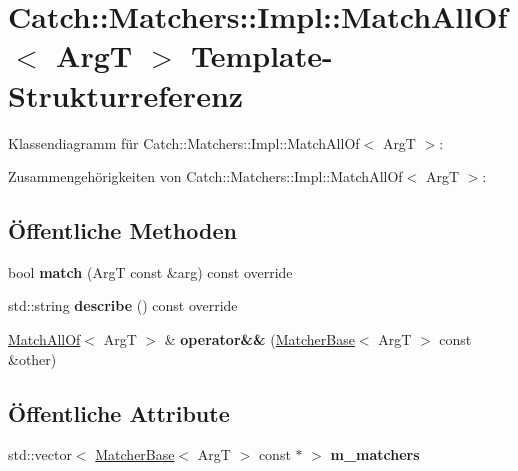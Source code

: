 \hypertarget{structCatch_1_1Matchers_1_1Impl_1_1MatchAllOf}{}\section{Catch\+:\+:Matchers\+:\+:Impl\+:\+:Match\+All\+Of$<$ ArgT $>$ Template-\/\+Strukturreferenz}
\label{structCatch_1_1Matchers_1_1Impl_1_1MatchAllOf}


Klassendiagramm für Catch\+:\+:Matchers\+:\+:Impl\+:\+:Match\+All\+Of$<$ ArgT $>$\+:


Zusammengehörigkeiten von Catch\+:\+:Matchers\+:\+:Impl\+:\+:Match\+All\+Of$<$ ArgT $>$\+:
\subsection*{Öffentliche Methoden}
\begin{DoxyCompactItemize}
\item 
\mbox{\label{structCatch_1_1Matchers_1_1Impl_1_1MatchAllOf_acfb377bda2c58ae62e6df9c3a8a89f8f}} 
bool {\bfseries match} (ArgT const \&arg) const override
\item 
\mbox{\label{structCatch_1_1Matchers_1_1Impl_1_1MatchAllOf_acbb9a083e93b546fd33c9235b644c40f}} 
std\+::string {\bfseries describe} () const override
\item 
\mbox{\label{structCatch_1_1Matchers_1_1Impl_1_1MatchAllOf_a9d0e38b36474336498d627610db434f3}} 
\hyperlink{structCatch_1_1Matchers_1_1Impl_1_1MatchAllOf}{Match\+All\+Of}$<$ ArgT $>$ \& {\bfseries operator\&\&} (\hyperlink{structCatch_1_1Matchers_1_1Impl_1_1MatcherBase}{Matcher\+Base}$<$ ArgT $>$ const \&other)
\end{DoxyCompactItemize}
\subsection*{Öffentliche Attribute}
\begin{DoxyCompactItemize}
\item 
\mbox{\label{structCatch_1_1Matchers_1_1Impl_1_1MatchAllOf_a98d6a2611f195a4a5c49f92fd877be9a}} 
std\+::vector$<$ \hyperlink{structCatch_1_1Matchers_1_1Impl_1_1MatcherBase}{Matcher\+Base}$<$ ArgT $>$ const  $\ast$ $>$ {\bfseries m\+\_\+matchers}
\end{DoxyCompactItemize}
